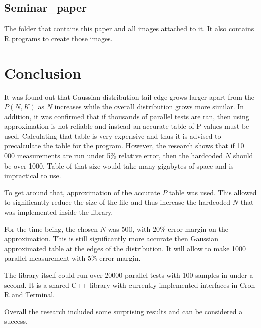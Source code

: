 \documentclass[12pt]{article}
\begin{document}
\subsection{Seminar\_paper}
The folder that contains this paper and all images attached to it. It also contains R programs to create those images.

\newpage

\section{Conclusion}
It was found out that Gaussian distribution tail edge grows larger apart from the $P(N, K)$ as $N$ increases while the overall distribution grows more similar. In addition, it was confirmed that if thousands of parallel tests are ran, then using approximation is not reliable and instead an accurate table of P values must be used. Calculating that table is very expensive and thus it is advised to precalculate the table for the program. However, the research shows that if 10 000 measurements are run under 5\% relative error, then the hardcoded $N$ should be over 1000. Table of that size would take many gigabytes of space and is impractical to use.

To get around that, approximation of the accurate $P$ table was used. This allowed to significantly reduce the size of the file and thus increase the hardcoded $N$ that was implemented inside the library.

For the time being, the chosen $N$ was 500, with $20\%$ error margin on the approximation. This is still significantly more accurate then Gaussian approximated table at the edges of the distribution. It will allow to make 1000 parallel measurement with 5\% error margin.

The library itself could run over 20000 parallel tests with 100 samples in under a second. It is a shared C++ library with currently implemented interfaces in Cron R and Terminal.

Overall the research included some surprising results and can be considered a success.

\newpage
\end{document}
